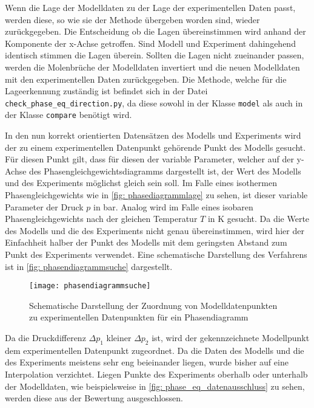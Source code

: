 \documentclass[../thesis.tex]{subfiles}
\begin{document}
Wenn die Lage der Modelldaten zu der Lage der experimentellen Daten passt, werden diese, so wie sie der Methode übergeben worden sind, wieder zurückgegeben. Die Entscheidung ob die Lagen übereinstimmen wird anhand der Komponente der x-Achse getroffen. Sind Modell und Experiment dahingehend identisch stimmen die Lagen überein. Sollten die Lagen nicht zueinander passen, werden die Molenbrüche der Modelldaten invertiert und die neuen Modelldaten mit den experimentellen Daten zurückgegeben. Die Methode, welche für die Lageerkennung zuständig ist befindet sich in der Datei \texttt{check\_phase\_eq\_direction.py}, da diese sowohl in der Klasse \texttt{model} als auch in der Klasse \texttt{compare} benötigt wird.

In den nun korrekt orientierten Datensätzen des Modells und Experiments wird der zu einem experimentellen Datenpunkt gehörende Punkt des Modells gesucht. Für diesen Punkt gilt, dass für diesen der variable Parameter, welcher auf der y-Achse des Phasengleichgewichtsdiagramms dargestellt ist, der Wert des Modells und des Experiments möglichst gleich sein soll. Im Falle eines isothermen Phasengleichgewichts wie in \autoref{fig: phasediagrammlage} zu sehen, ist dieser variable Parameter der Druck $ p $ in bar. Analog wird im Falle eines isobaren Phasengleichgewichts nach der gleichen Temperatur $ T $ in K gesucht. Da die Werte des Modells und die des Experiments nicht genau übereinstimmen, wird hier der Einfachheit halber der Punkt des Modells mit dem geringsten Abstand zum Punkt des Experiments verwendet. Eine schematische Darstellung des Verfahrens ist in \autoref{fig: phasendiagrammsuche} dargestellt. 

\begin{figure}[htb]
	\centering
	\texttt{[image: phasendiagrammsuche]}
	\caption{Schematische Darstellung der Zuordnung von Modelldatenpunkten zu experimentellen Datenpunkten für ein Phasendiagramm}
	\label{fig: phasendiagrammsuche}
\end{figure}

Da die Druckdifferenz $\Delta p_1$ kleiner $ \Delta p_2$ ist, wird der gekennzeichnete Modellpunkt dem experimentellen Datenpunkt zugeordnet. Da die Daten des Modells und die des Experiments meistens sehr eng beieinander liegen, wurde bisher auf eine Interpolation verzichtet. Liegen Punkte des Experiments oberhalb oder unterhalb der Modelldaten, wie beispielsweise in \autoref{fig: phase_eq_datenausschluss} zu sehen, werden diese aus der Bewertung ausgeschlossen. 
\end{document}
